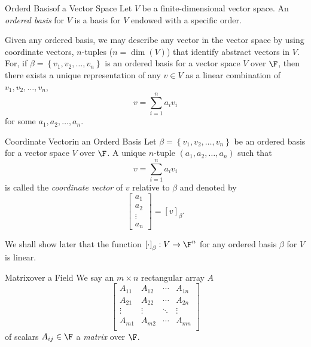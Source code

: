 \documentclass[linearalgebraI]{subfiles}
\begin{document}
    \begin{definition}{Orderd Basis}{of a Vector Space}
        Let $V$ be a finite-dimensional vector space. An \emph{ordered basis} for $V$ is a basis for $V$ endowed with a specific order.
    \end{definition}

    \begin{remark}
        Given any ordered basis, we may describe any vector in the vector space by using coordinate vectors, $n$-tuples ($n = \dim(V)$) that identify abstract vectors in $V$. For, if $\beta = \left\lbrace v_1, v_2, \ldots, v_n \right\rbrace$ is an ordered basis for a vector space $V$ over $\F$, then there exists a unique representation of any $v\in V$ as a linear combination of $v_1,v_2,\ldots,v_n$,
        \begin{equation*}
            v = \sum^{n}_{i=1} a_iv_i
        \end{equation*}
        for some $a_1,a_2,\ldots,a_n$.
    \end{remark}

    \begin{definition}{Coordinate Vector}{in an Orderd Basis}
        Let $\beta = \left\lbrace v_1, v_2, \ldots, v_n \right\rbrace$ be an ordered basis for a vector space $V$ over $\F$. A unique $n$-tuple $(a_1, a_2, \ldots, a_n)$ such that
        \begin{equation*}
            v = \sum^n_{i=1} a_iv_i
        \end{equation*}
        is called the \emph{coordinate vector} of $v$ relative to $\beta$ and denoted by
        \begin{equation*}
            \begin{bmatrix} a_1 \\ a_2 \\ \vdots \\ a_n \end{bmatrix} = \left[ v \right]_\beta.
        \end{equation*}
    \end{definition}

    \begin{remark}
        We shall show later that the function $\left[ \cdot \right] _\beta:V\to\F^n$ for any ordered basis $\beta$ for $V$ is linear.
    \end{remark}

    \begin{definition}{Matrix}{over a Field}
        We say an $m\times n$ rectangular array $A$
        \begin{equation*}
            \begin{bmatrix}
                A_{11} & A_{12} & \cdots & A_{1n} \\
                A_{21} & A_{22} & \cdots & A_{2n} \\
                \vdots & \vdots & \ddots & \vdots \\
                A_{m1} & A_{m2} & \cdots & A_{mn}\\
            \end{bmatrix}
        \end{equation*}
        of scalars $A_{ij}\in\F$ a \emph{matrix} over $\F$.
    \end{definition}
\end{document}
